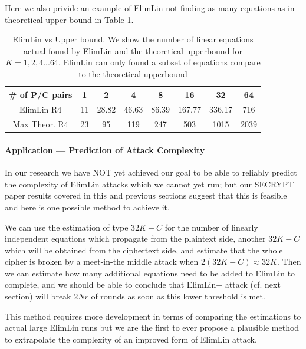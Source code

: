 Here we also privide an example of ElimLin not finding as many equations as in theoretical upper bound in Table \ref{tab:ElimLinVsUpperBound}.
\begin{table}[h!]
	\centering
	\caption[ElimLin vs Upper bound]{ElimLin vs Upper bound. We show the number of linear equations actual found by ElimLin and the theoretical upperbound for $K = 1,2,4 ... 64$. ElimLin can only found a subset of equations compare to the theoretical upperbound}
	\label{tab:ElimLinVsUpperBound}
	\begin{tabular}{|c|c|c|c|c|c|c|c|}
		\hline
		\# of P/C pairs& 1 &	2	& 4 &	8	& 16	& 32	&  64 \\ \hline
		ElimLin R4    & 11 & 28.82 & 46.63 & 86.39 & 167.77 & 336.17 & 716  \\ \hline
		Max Theor. R4 & 23 & 95    & 119   & 247   & 503    & 1015   & 2039 \\ \hline
	\end{tabular}
\end{table}

\paragraph{Application --- Prediction of Attack Complexity}
In our research we have NOT yet achieved our goal to be able to reliably predict the complexity of ElimLin attacks which we cannot yet run; but our SECRYPT paper results covered in this and previous sections suggest that this is feasible and here is one possible method to achieve it. 

\begin{conj} \label{Con:ElimLin}
We can use the estimation of type $32K-C$ for the number of linearly independent equations 
which propagate from the plaintext side, another $32K-C$ which will be obtained from the ciphertext side, 
and estimate that the whole cipher is broken by a meet-in-the middle attack when $2(32K-C)\approx 32K$. 
Then we can estimate how many additional equations need to be added to ElimLin to complete, 
and we should be able to conclude that ElimLin+ attack (cf. next section) 
will break $2Nr$ of rounds as soon as this lower threshold is met. 

This method requires more development in terms of comparing the estimations to actual large ElimLin runs 
but we are the first to ever propose a plausible method to extrapolate the complexity of an improved 
form of ElimLin attack. 
\end{conj}

